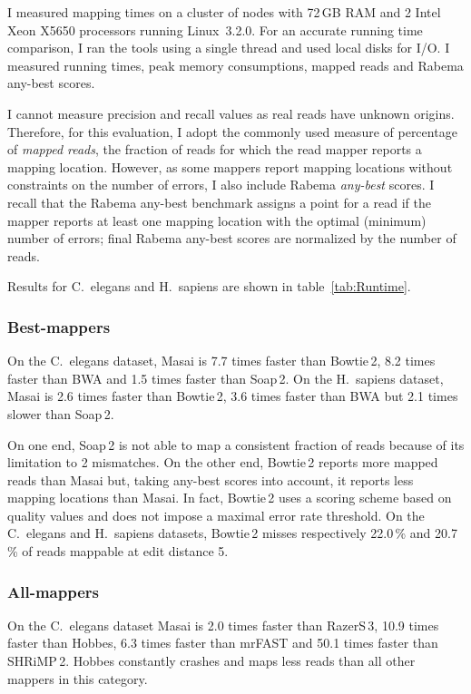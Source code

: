 I measured mapping times on a cluster of nodes with 72\,GB RAM and 2 Intel Xeon X5650 processors running Linux~3.2.0.
For an accurate running time comparison, I ran the tools using a single thread and used local disks for I/O.
I measured running times, peak memory consumptions, mapped reads and Rabema any-best scores.

I cannot measure precision and recall values as real reads have unknown origins.
Therefore, for this evaluation, I adopt the commonly used measure of percentage of \emph{mapped reads}, \ie the fraction of reads for which the read mapper reports a mapping location.
However, as some mappers report mapping locations without constraints on the number of errors, I also include Rabema \emph{any-best} scores.
I recall that the Rabema any-best benchmark assigns a point for a read if the mapper reports at least one mapping location with the optimal (minimum) number of errors;
final Rabema any-best scores are normalized by the number of reads.

Results for C.~elegans and H.~sapiens are shown in table~\ref{tab:Runtime}.

\subsubsection{Best-mappers}
On the C.~elegans dataset, Masai is 7.7 times faster than Bowtie\,2, 8.2 times faster than BWA and 1.5 times faster than Soap\,2.
On the H.~sapiens dataset, Masai is 2.6 times faster than Bowtie\,2, 3.6 times faster than BWA but 2.1 times slower than Soap\,2.

On one end, Soap\,2 is not able to map a consistent fraction of reads because of its limitation to 2 mismatches.
On the other end, Bowtie\,2 reports more mapped reads than Masai but, taking any-best scores into account, it reports less mapping locations than Masai.
In fact, Bowtie\,2 uses a scoring scheme based on quality values and does not impose a maximal error rate threshold.
On the C.~elegans and H.~sapiens datasets, Bowtie\,2 misses respectively 22.0\,\% and 20.7\,\% of reads mappable at edit distance 5.

\subsubsection{All-mappers}
On the C.~elegans dataset Masai is 2.0 times faster than RazerS\,3, 10.9 times faster than Hobbes, 6.3 times faster than mrFAST and 50.1 times faster than SHRiMP\,2.
Hobbes constantly crashes and maps less reads than all other mappers in this category.

